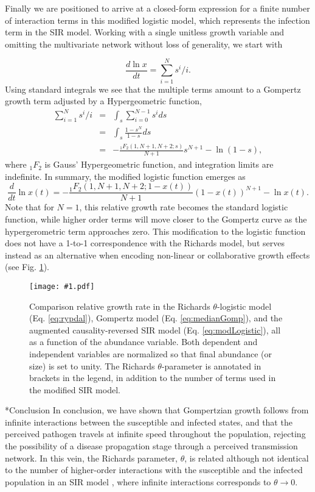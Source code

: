 \documentclass{article}
\newcommand{\insertPdfFig}[3]{
  \begin{figure}[H]
  \centering
  \texttt{[image: \#1.pdf]}
  \caption{#2}
  \label{fig:#1}
  \end{figure}
}
\begin{document}
Finally we are positioned to arrive at a closed-form expression for a finite number of interaction terms in this modified logistic model, which represents the infection term in the SIR model. Working with a single unitless growth variable and omitting the multivariate network without loss of generality, we start with

\begin{equation}
\frac{d \ln{x}}{dt} = \sum_{i=1}^N s^i/i.
\end{equation}
Using standard integrals we see that the multiple terms amount to a Gompertz growth term adjusted by a Hypergeometric function,
\begin{eqnarray*}
  \sum_{i=1}^N s^i/i &=& \int_s \sum_{i=0}^{N-1} s^i ds\\
  &=&\int_s \frac{1-s^N}{1-s} ds\\
  &=&- \frac{{}_{1}F_{2}({1,N+1,N+2;s})}{N+1}s^{N+1} - \ln(1-s),
\end{eqnarray*}
where ${}_1F_{2}$ is Gauss' Hypergeometric function, and integration limits are indefinite. In summary, the modified logistic function emerges as
 \begin{equation}
 \label{eq:modLogistic}
\frac{d}{dt}\ln{x(t)} = - \frac{{}_{1}F_{2}({1,N+1,N+2;1-x(t)})}{N+1}(1-x(t))^{N+1} - \ln{x(t)}.
 \end{equation}
 Note that for $N=1$, this relative growth rate becomes the standard logistic function, while higher order terms will move closer to the Gompertz curve as the hypergerometric term approaches zero. This modification to the logistic function does not have a 1-to-1 correspondence with the Richards model, but serves instead as an alternative when encoding non-linear or collaborative growth effects (see Fig. \ref{fig:hypergeometric}).

\insertPdfFig{hypergeometric}{Comparison relative growth rate in the Richards $\theta$-logistic model (Eq. \ref{eq:rypdal}), Gompertz model (Eq. \ref{eq:medianGomp}), and the augmented causality-reversed SIR model (Eq. \ref{eq:modLogistic}), all as a function of the abundance variable. Both dependent and independent variables are normalized so that final abundance (or size) is set to unity. The Richards $\theta$-parameter is annotated in brackets in the legend, in addition to the number of terms used in the modified SIR model.} 


\section*{Conclusion}
In conclusion, we have shown that Gompertzian growth follows from infinite interactions between the susceptible and infected states, and that the perceived pathogen travels at infinite speed throughout the population, rejecting the possibility of a disease propagation stage through a perceived transmission network. In this vein, the Richards parameter, $\theta$, is related although not identical to the number of higher-order interactions with the susceptible and the infected population in an SIR model \cite{richards1959flexible}, where infinite interactions corresponds to $\theta\rightarrow 0$. 
\end{document}
